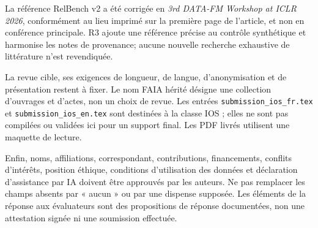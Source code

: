 \documentclass[10pt,a4paper]{article}
\newcommand{\src}[1]{{\small\nolinkurl{#1}}}
\begin{document}
La référence RelBench v2 a été corrigée en \emph{3rd DATA-FM Workshop at ICLR 2026}, conformément au lieu imprimé sur la première page de l'article, et non en conférence principale\cite{gu2026relbench}. R3 ajoute une référence précise au contrôle synthétique et harmonise les notes de provenance; aucune nouvelle recherche exhaustive de littérature n'est revendiquée.

La revue cible, ses exigences de longueur, de langue, d'anonymisation et de présentation restent à fixer. Le nom FAIA hérité désigne une collection d'ouvrages et d'actes, non un choix de revue. Les entrées \src{submission_ios_fr.tex} et \src{submission_ios_en.tex} sont destinées à la classe IOS ; elles ne sont pas compilées ou validées ici pour un support final. Les PDF livrés utilisent une maquette de lecture.

Enfin, noms, affiliations, correspondant, contributions, financements, conflits d'intérêts, position éthique, conditions d'utilisation des données et déclaration d'assistance par IA doivent être approuvés par les auteurs. Ne pas remplacer les champs absents par « aucun » ou par une dispense supposée. Les éléments de la réponse aux évaluateurs sont des propositions de réponse documentées, non une attestation signée ni une soumission effectuée.



\end{document}
